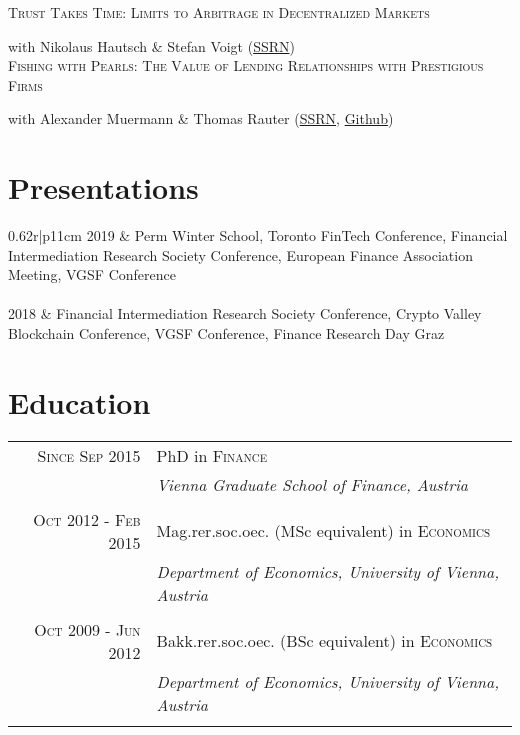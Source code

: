 \documentclass[a4paper,11pt]{article}
\begin{document}
\noindent\textsc{Trust Takes Time: Limits to Arbitrage in Decentralized Markets} 

with Nikolaus Hautsch \& Stefan Voigt (\href{https://papers.ssrn.com/sol3/papers.cfm?abstract_id=3302159}{SSRN})\\

\noindent\textsc{Fishing with Pearls: The Value of Lending Relationships with Prestigious Firms} 

with Alexander Muermann \& Thomas Rauter (\href{https://papers.ssrn.com/sol3/papers.cfm?abstract_id=2703343}{SSRN}, \href{https://github.com/thomasrauter}{Github})\\

\section{Presentations}
\centering
\begin{tabularx}{0.62\linewidth}{r|p{11cm}}
	2019 & Perm Winter School, Toronto FinTech Conference, Financial Intermediation Research Society Conference, European Finance Association Meeting, VGSF Conference \\
	 \\
   	2018 & Financial Intermediation Research Society Conference, Crypto Valley Blockchain Conference, VGSF Conference, Finance Research Day Graz\\ 
\end{tabularx}


\section{Education}
\centering
\begin{tabularx}{0.99\linewidth}{r|p{11cm}}
	\textsc{Since Sep 2015} & PhD in \textsc{Finance}\\
	& \emph{Vienna Graduate School of Finance, Austria}\\
	\multicolumn{2}{c}{} \\
	\textsc{Oct 2012 - Feb 2015} & Mag.rer.soc.oec. (MSc equivalent) in \textsc{Economics}  \\
	& \emph{Department of Economics, University of Vienna, Austria}\\
	\multicolumn{2}{c}{} \\
	\textsc{Oct 2009 - Jun 2012} & Bakk.rer.soc.oec. (BSc equivalent) in \textsc{Economics} \\
	& \emph{Department of Economics, University of Vienna, Austria}\\
	\multicolumn{2}{c}{}
\end{tabularx}
\end{document}

